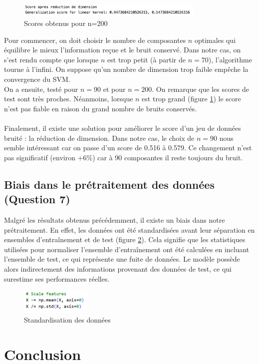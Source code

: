 \documentclass[a4paper,12pt]{article}
\begin{document}
\begin{figure}[H]
    \centering
    \includegraphics[width=0.8\textwidth]{Images/n=200.png}
    \caption{Scores obtenus pour n=200}\label{fig : dim2}
\end{figure}

Pour commencer, on doit choisir le nombre de composantes $n$ optimales qui équilibre le mieux l'information reçue et le bruit conservé.
Dans notre cas, on s'est rendu compte que lorsque $n$ est trop petit (à partir de $n = 70$), l'algorithme tourne à l'infini. On suppose qu'un  nombre de dimension trop faible empêche la convergence du SVM.\\
On a ensuite, testé pour $n = 90$ et pour $n = 200$. On remarque que les scores de test sont très proches. Néanmoins, lorsque $n$ est trop grand (figure \ref{fig : dim2}) le score n'est pas fiable en raison du grand nombre de bruits conservés.\\
\\
Finalement, il existe une solution pour améliorer le score d'un jeu de données bruité : la réduction de dimension. Dans notre cas, le choix de $n = 90$ nous semble intéressant car on passe d'un score de 0.516 à 0.579.
Ce changement n'est pas significatif (environ +6\%) car à 90 composantes il reste toujours du bruit.

\subsection{Biais dans le prétraitement des données (Question 7)}

Malgré les résultats obtenus précédemment, il existe un biais dans notre prétraitement. 
En effet, les données ont été standardisées avant leur séparation en ensembles d'entraînement et de test (figure \ref{fig : q7}).
Cela signifie que les statistiques utilisées pour normaliser l'ensemble d'entraînement ont été calculées en incluant l'ensemble de test, ce qui représente une fuite de données. 
Le modèle possède alors indirectement des informations provenant des données de test, ce qui surestime ses performances réelles.


\begin{figure}[H]    
    \centering    
    \includegraphics[width=0.3\textwidth]{Images/q7.png}
    \caption{Standardisation des données}\label{fig : q7}
\end{figure}

\section{Conclusion}
\end{document}
